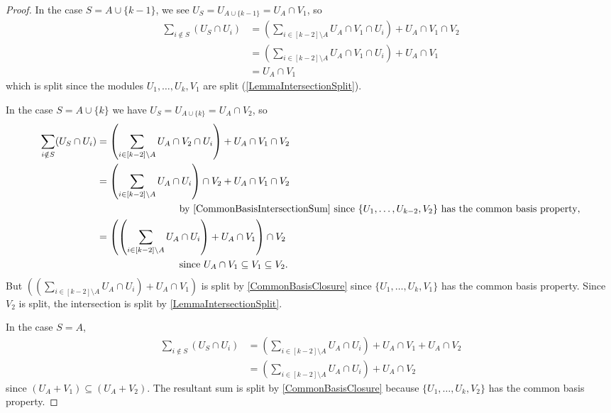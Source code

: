 \documentclass[a4paper]{amsart}
\numberwithin{theoremcounter}{section}
\theoremstyle{definition}
\theoremstyle{remark}
\begin{document}
\begin{proof}
 In the case $S=A \cup \{k-1\}$, we see $U_S = U_{A \cup \{k-1\}} = U_A \cap V_1$, so 
 \begin{align*}
 \sum_{i \notin S} (U_S \cap U_i)  & = \left( \sum_{ i \in [k-2]\setminus A} U_A \cap V_1 \cap U_i \right) + U_A \cap V_1 \cap V_2 \\  
 & = \left( \sum_{ i \in [k-2]\setminus A} U_A \cap V_1 \cap U_i \right) + U_A \cap V_1 \\
 & = U_A \cap V_1
 \end{align*}
 which is split since the modules $U_1, \dots, U_k, V_1$ are split (\autoref{LemmaIntersectionSplit}). 
 
 
  In the case $S=A \cup \{k\}$ we have $U_S = U_{A \cup \{k\}} = U_A \cap V_2$, so 
 \begin{align*}
 \sum_{i \notin S} (U_S \cap U_i)  & = \left( \sum_{ i \in [k-2]\setminus A} U_A \cap V_2 \cap U_i \right) + U_A \cap V_1 \cap V_2  \\  
& = \left( \sum_{ i \in [k-2]\setminus A} U_A  \cap U_i \right)\cap V_2 + U_A \cap V_1  \cap V_2 \\ & \qquad \qquad \qquad \qquad \text{ by \autoref{CommonBasisIntersectionSum} since $\{U_1, \dots, U_{k-2}, V_2\}$ has the common basis property}, \\  
& = \left(\left( \sum_{ i \in [k-2]\setminus A} U_A  \cap U_i \right) + U_A \cap V_1 \right) \cap V_2  \\  & \qquad \qquad \qquad \qquad  \text{ since $U_A \cap V_1 \subseteq V_1 \subseteq V_2$.} 
 \end{align*}
But $\left(\left( \sum_{ i \in [k-2]\setminus A} U_A  \cap U_i \right) + U_A \cap V_1 \right)$ is split  by \autoref{CommonBasisClosure}  since  $\{U_1, \dots, U_k, V_1\}$ has the common basis property.  Since $V_2$ is split, the intersection is split by \autoref{LemmaIntersectionSplit}. 
 
 
  In the case $S=A$, 
 \begin{align*}
 \sum_{i \notin S} (U_S \cap U_i)  & = \left( \sum_{ i \in [k-2]\setminus A} U_A \cap U_i \right) + U_A \cap V_1 + U_A \cap V_2 \\  
 & = \left( \sum_{ i \in [k-2]\setminus A} U_A  \cap U_i \right)  + U_A \cap V_2 
 \end{align*}
 since $(U_A + V_1) \subseteq (U_A + V_2)$. The resultant sum is split by \autoref{CommonBasisClosure} because $\{U_1, \dots, U_k, V_2\}$ has the common basis property. 
\end{proof} 
\end{document}
